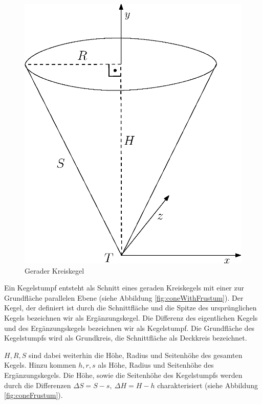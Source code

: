 \begin{figure}[!htb]
	\centering
	\includegraphics[scale=.5]{images/fullCone.eps}
	\caption{Gerader Kreiskegel}
	\label{fig:cone}
\end{figure}



\begin{definition}
	Ein Kegelstumpf entsteht als Schnitt eines geraden Kreiskegels mit einer zur Grundfläche parallelen Ebene (siehe Abbildung \ref{fig:coneWithFrustum}). Der Kegel, der definiert ist durch die Schnittfläche und die Spitze des ursprünglichen Kegels bezeichnen wir als Ergänzungskegel. Die Differenz des eigentlichen Kegels und des Ergänzungskegels bezeichnen wir als Kegelstumpf. Die Grundfläche des Kegelstumpfs wird als Grundkreis, die Schnittfläche als Deckkreis bezeichnet. 
	
	\noindent $H, R, S$ sind dabei weiterhin die Höhe, Radius und Seitenhöhe des gesamten Kegels. Hinzu kommen $h,r,s$ als Höhe, Radius und Seitenhöhe des Ergänzungskegels. Die Höhe, sowie die Seitenhöhe des Kegelstumpfs werden durch die Differenzen $\Delta S = S - s,~ \Delta H = H-h$ charakterisiert (siehe Abbildung \ref{fig:coneFrustum}). 
\end{definition}

